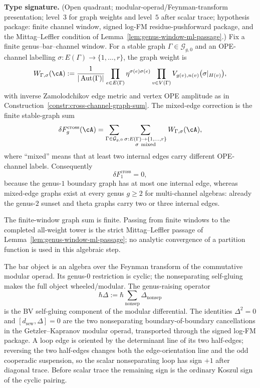 \begin{proposition}
\label{prop:stable-graph-finite-window-passage}
\textbf{Type signature.} (Open quadrant; modular-operad/Feynman-transform
presentation; level~$3$ for graph weights and level~$5$ after scalar
trace; hypothesis package: finite channel window, signed log-FM
residue-pushforward package, and the Mittag--Leffler condition of
Lemma~\ref{lem:genus-window-ml-passage}.)
Fix a finite genus--bar--channel window.  For a stable graph
$\Gamma\in\mathcal G_{g,0}$ and an OPE-channel labelling
$\sigma\colon E(\Gamma)\to\{1,\ldots,r\}$, the graph weight is
\begin{equation}\label{eq:stable-graph-channel-weight}
W_{\Gamma,\sigma}(\cA)
:=
\frac{1}{|\operatorname{Aut}(\Gamma)|}
\prod_{e\in E(\Gamma)}\eta^{\sigma(e)\sigma(e)}
\prod_{v\in V(\Gamma)}
V_{g(v),n(v)}\bigl(\sigma|_{H(v)}\bigr),
\end{equation}
with inverse Zamolodchikov edge metric and vertex OPE amplitude as in
Construction~\ref{constr:cross-channel-graph-sum}.  The mixed-edge
correction is the finite stable-graph sum
\begin{equation}\label{eq:cross-channel-mixed-edge-sum}
\delta F_g^{\mathrm{cross}}(\cA)
=
\sum_{\Gamma\in\mathcal G_{g,0}}
\sum_{\substack{\sigma:E(\Gamma)\to\{1,\ldots,r\}\\
\sigma\ \mathrm{mixed}}}
W_{\Gamma,\sigma}(\cA),
\end{equation}
where ``mixed'' means that at least two internal edges carry different
OPE-channel labels.  Consequently
\[
\delta F_1^{\mathrm{cross}}=0,
\]
because the genus-$1$ boundary graph has at most one internal edge,
whereas mixed-edge graphs exist at every genus $g\ge2$ for
multi-channel algebras: already the genus-$2$ sunset and theta graphs
carry two or three internal edges.

The finite-window graph sum is finite.  Passing from finite windows to
the completed all-weight tower is the strict
Mittag--Leffler passage of Lemma~\ref{lem:genus-window-ml-passage}; no
analytic convergence of a partition function is used in this algebraic
step.

The bar object is an algebra over the Feynman transform of the
commutative modular operad.  Its genus-$0$ restriction is cyclic; the
nonseparating self-gluing makes the full object wheeled/modular.  The
genus-raising operator
\[
\hbar\Delta:=\hbar\sum_{\mathrm{nonsep}}\Delta_{\mathrm{nonsep}}
\]
is the BV self-gluing component of the modular differential.  The
identities $\Delta^2=0$ and $[d_{\mathrm{sew}},\Delta]=0$ are the two
nonseparating boundary-of-boundary cancellations in the
Getzler--Kapranov modular operad, transported through the signed log-FM
package.  A loop edge is oriented by the determinant line of its two
half-edges; reversing the two half-edges changes both the
edge-orientation line and the odd cooperadic suspension, so the scalar
nonseparating loop has sign $+1$ after diagonal trace.  Before scalar
trace the remaining sign is the ordinary Koszul sign of the cyclic
pairing.
\end{proposition}

